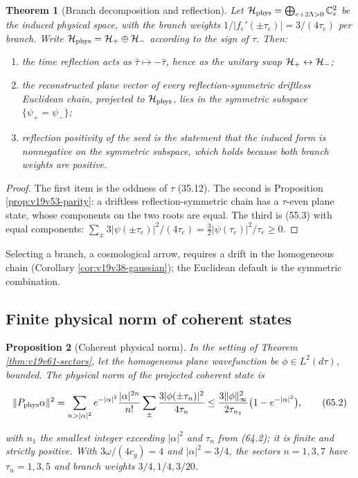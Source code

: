 \documentclass[11pt]{article}
\newtheorem{theorem}{Theorem}[section]
\newtheorem{proposition}[theorem]{Proposition}
\theoremstyle{remark}
\begin{document}
\begin{theorem}[Branch decomposition and reflection]
\label{thm:v19v62-branches}
Let \({\cal H}_{\rm phys}=\bigoplus_{e+2\Lambda>0}\mathbb C^2_e\) be the
induced physical space, with the branch weights
\(1/|f_e'(\pm\tau_e)|=3/(4\tau_e)\) per branch.  Write
\({\cal H}_{\rm phys}={\cal H}_+\oplus{\cal H}_-\) according to the sign
of \(\tau\).  Then:
\begin{enumerate}
\item the time reflection acts as \(\hat\tau\mapsto-\hat\tau\), hence as
      the unitary swap \({\cal H}_+\leftrightarrow{\cal H}_-\);
\item the reconstructed plane vector of every reflection-symmetric
      driftless Euclidean chain, projected to \({\cal H}_{\rm phys}\),
      lies in the symmetric subspace \(\{\psi_+=\psi_-\}\);
\item reflection positivity of the seed is the statement that the
      induced form is nonnegative on the symmetric subspace, which
      holds because both branch weights are positive.
\end{enumerate}
\end{theorem}

\begin{proof}
The first item is the oddness of \(\tau\) (35.12).  The second is
Proposition \ref{prop:v19v53-parity}: a driftless reflection-symmetric
chain has a \(\tau\)-even plane state, whose components on the two
roots are equal.  The third is (55.3) with equal components:
\(\sum_\pm3|\psi(\pm\tau_e)|^2/(4\tau_e)=\tfrac32|\psi(\tau_e)|^2/\tau_e\geq0\).
\end{proof}

Selecting a branch, a cosmological arrow, requires a drift in the
homogeneous chain (Corollary \ref{cor:v19v38-gaussian}); the Euclidean
default is the symmetric combination.

\subsection{Finite physical norm of coherent states}

\begin{proposition}[Coherent physical norm]
\label{prop:v19v62-norm}
In the setting of Theorem \ref{thm:v19v61-sectors}, let the homogeneous
plane wavefunction be \(\phi\in L^2(d\tau)\), bounded.  The physical
norm of the projected coherent state is

\[
 \|P_{\rm phys}\alpha\|^2=\sum_{n>|\alpha|^2}e^{-|\alpha|^2}\frac{|\alpha|^{2n}}{n!}
 \sum_\pm\frac{3|\phi(\pm\tau_n)|^2}{4\tau_n}
 \leq\frac{3\|\phi\|_\infty^2}{2\tau_{n_1}}\bigl(1-e^{-|\alpha|^2}\bigr),
                                                                    \tag{65.2}
\]

with \(n_1\) the smallest integer exceeding \(|\alpha|^2\) and
\(\tau_n\) from (64.2); it is finite and strictly positive.  With
\(3\omega/(4c_g)=4\) and \(|\alpha|^2=3/4\), the sectors \(n=1,3,7\)
have \(\tau_n=1,3,5\) and branch weights \(3/4,1/4,3/20\).
\end{proposition}
\end{document}
